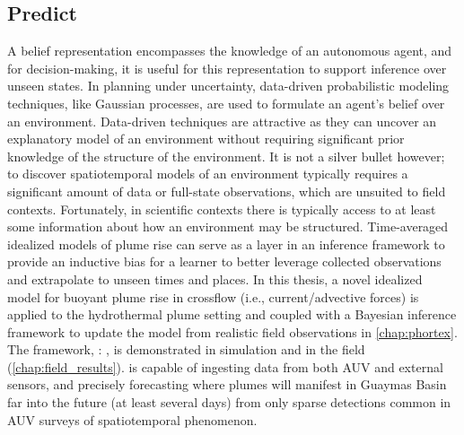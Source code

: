 \subsection{Predict}
A belief representation encompasses the knowledge of an autonomous agent, and for decision-making, it is useful for this representation to support inference over unseen states. 
In planning under uncertainty, data-driven probabilistic modeling techniques, like Gaussian processes\autocite{Rasmussen2004}, are used to formulate an agent's belief over an environment.
Data-driven techniques are attractive as they can uncover an explanatory model of an environment without requiring significant prior knowledge of the structure of the environment.
It is not a silver bullet however; to discover spatiotemporal models of an environment typically requires a significant amount of data or full-state observations, which are unsuited to field contexts.
Fortunately, in scientific contexts there is typically access to at least some information about how an environment may be structured.
Time-averaged idealized models of plume rise can serve as a layer in an inference framework to provide an inductive bias for a learner to better leverage collected observations and extrapolate to unseen times and places.
In this thesis, a novel idealized model for buoyant plume rise in crossflow (i.e., current/advective forces) is applied to the hydrothermal plume setting\autocite{tohidi2016highly} and coupled with a Bayesian inference framework to update the model from realistic field observations in \cref{chap:phortex}.
The framework, \PHUMES: \phumes, is demonstrated in simulation and in the field (\cref{chap:field_results}).
\PHUMES is capable of ingesting data from both AUV \Sentry and external sensors, and precisely forecasting where plumes will manifest in Guaymas Basin far into the future (at least several days) from only sparse detections common in AUV surveys of spatiotemporal phenomenon.

